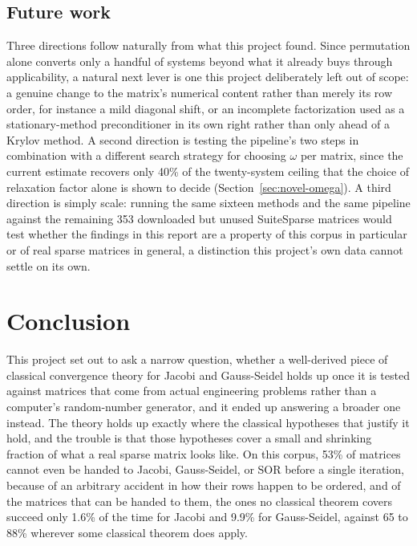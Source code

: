 \documentclass[11pt,a4paper]{article}
\begin{document}
\subsection{Future work}
\label{sec:discussion-future}

Three directions follow naturally from what this project found. Since permutation alone
converts only a handful of systems beyond what it already buys through applicability, a
natural next lever is one this project deliberately left out of scope: a genuine change to
the matrix's numerical content rather than merely its row order, for instance a mild
diagonal shift, or an incomplete factorization used as a stationary-method preconditioner
in its own right rather than only ahead of a Krylov method. A second direction is testing
the pipeline's two steps in combination with a different search strategy for choosing
$\omega$ per matrix, since the current estimate recovers only 40\% of the twenty-system
ceiling that the choice of relaxation factor alone is shown to decide
(Section~\ref{sec:novel-omega}). A third direction is simply scale: running the same
sixteen methods and the same pipeline against the remaining 353 downloaded but unused
SuiteSparse matrices would test whether the findings in this report are a property of this
corpus in particular or of real sparse matrices in general, a distinction this project's
own data cannot settle on its own.

\clearpage
\section{Conclusion}
\label{sec:conclusion}

This project set out to ask a narrow question, whether a well-derived piece of classical
convergence theory for Jacobi and Gauss-Seidel holds up once it is tested against matrices
that come from actual engineering problems rather than a computer's random-number
generator, and it ended up answering a broader one instead. The theory holds up exactly
where the classical hypotheses that justify it hold, and the trouble is that those
hypotheses cover a small and shrinking fraction of what a real sparse matrix looks like. On
this corpus, 53\% of matrices cannot even be handed to Jacobi, Gauss-Seidel, or SOR before
a single iteration, because of an arbitrary accident in how their rows happen to be
ordered, and of the matrices that can be handed to them, the ones no classical theorem
covers succeed only 1.6\% of the time for Jacobi and 9.9\% for Gauss-Seidel, against 65 to
88\% wherever some classical theorem does apply.
\end{document}
